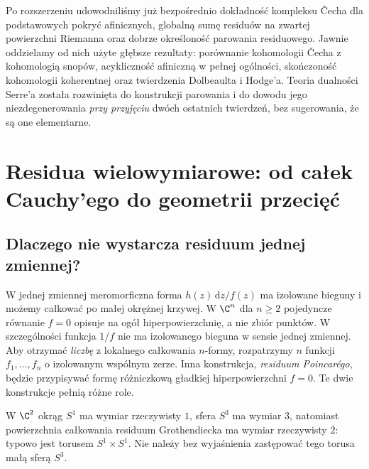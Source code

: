 Po rozszerzeniu udowodniliśmy już bezpośrednio dokładność
kompleksu Čecha dla podstawowych pokryć afinicznych,
globalną sumę residuów na zwartej powierzchni Riemanna
oraz dobrze określoność parowania residuowego.
Jawnie oddzielamy od nich użyte głębsze rezultaty:
porównanie kohomologii Čecha z kohomologią snopów,
acykliczność afiniczną w pełnej ogólności, skończoność
kohomologii koherentnej oraz twierdzenia Dolbeaulta
i Hodge'a. Teoria dualności Serre'a została rozwinięta
do konstrukcji parowania i do dowodu jego
niezdegenerowania \emph{przy przyjęciu} dwóch
ostatnich twierdzeń, bez sugerowania, że są one elementarne.


\section{Residua wielowymiarowe: od całek Cauchy'ego do geometrii przecięć}
\label{sec:ga4-residua-wielo}

\subsection{Dlaczego nie wystarcza residuum jednej zmiennej?}

W jednej zmiennej meromorficzna forma $h(z)\,\mathrm dz/f(z)$
ma izolowane bieguny i możemy całkować po małej okrężnej krzywej.
W $\C^n$ dla $n\ge2$ pojedyncze równanie $f=0$ opisuje na ogół
hiperpowierzchnię, a nie zbiór punktów. W szczególności funkcja
$1/f$ nie ma izolowanego bieguna w sensie jednej zmiennej.
Aby otrzymać \emph{liczbę} z lokalnego całkowania $n$-formy,
rozpatrzymy $n$ funkcji $f_1,\ldots,f_n$ o izolowanym wspólnym zerze.
Inna konstrukcja, \emph{residuum Poincarégo}, będzie przypisywać
formę różniczkową gładkiej hiperpowierzchni $f=0$.
Te dwie konstrukcje pełnią różne role.

\begin{uwaga}
W $\C^2$ okrąg $S^1$ ma wymiar rzeczywisty $1$, sfera
$S^3$ ma wymiar $3$, natomiast powierzchnia całkowania
residuum Grothendiecka ma wymiar rzeczywisty $2$:
typowo jest torusem $S^1\times S^1$.
Nie należy bez wyjaśnienia zastępować tego torusa małą sferą $S^3$.
\end{uwaga}

